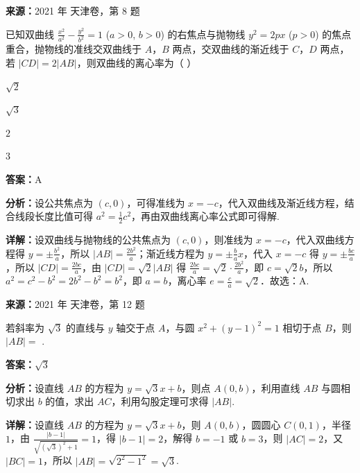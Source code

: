 \begin{question}[points=5]
\textbf{来源：}2021 年 天津卷，第 8 题\par
已知双曲线 $\frac{x^2}{a^2} - \frac{y^2}{b^2} = 1$ ($a > 0$, $b > 0$) 的右焦点与抛物线 $y^2 = 2px$ ($p > 0$) 的焦点重合，抛物线的准线交双曲线于 $A$，$B$ 两点，交双曲线的渐近线于 $C$，$D$ 两点，若 $|CD| = 2|AB|$，则双曲线的离心率为（   ）
\begin{choices}
  \item $\sqrt{2}$
  \item $\sqrt{3}$
  \item $2$
  \item $3$
\end{choices}
\begin{solution}
\textbf{答案：}A

\textbf{分析：}设公共焦点为 $(c,0)$，可得准线为 $x=-c$，代入双曲线及渐近线方程，结合线段长度比值可得 $a^2 = \frac{1}{2}c^2$，再由双曲线离心率公式即可得解.

\textbf{详解：}设双曲线与抛物线的公共焦点为 $(c,0)$，则准线为 $x=-c$，代入双曲线方程得 $y = \pm \frac{b^2}{a}$，所以 $|AB| = \frac{2b^2}{a}$；渐近线方程为 $y = \pm \frac{b}{a}x$，代入 $x=-c$ 得 $y = \pm \frac{bc}{a}$，所以 $|CD| = \frac{2bc}{a}$，由 $|CD| = \sqrt{2}|AB|$ 得 $\frac{2bc}{a} = \sqrt{2} \cdot \frac{2b^2}{a}$，即 $c = \sqrt{2}b$，所以 $a^2 = c^2 - b^2 = 2b^2 - b^2 = b^2$，即 $a=b$，离心率 $e = \frac{c}{a} = \sqrt{2}$．故选：A.
\end{solution}
\end{question}

\begin{question}[points=5]
\textbf{来源：}2021 年 天津卷，第 12 题\par
若斜率为 $\sqrt{3}$ 的直线与 $y$ 轴交于点 $A$，与圆 $x^2 + (y-1)^2 = 1$ 相切于点 $B$，则 $|AB| =$ .
\fillin[{$\sqrt{3}$}]
\begin{solution}
\textbf{答案：}$\sqrt{3}$

\textbf{分析：}设直线 $AB$ 的方程为 $y = \sqrt{3}x + b$，则点 $A(0,b)$，利用直线 $AB$ 与圆相切求出 $b$ 的值，求出 $AC$，利用勾股定理可求得 $|AB|$.

\textbf{详解：}设直线 $AB$ 的方程为 $y = \sqrt{3}x + b$，则 $A(0,b)$，圆圆心 $C(0,1)$，半径 $1$，由 $\frac{|b-1|}{\sqrt{(\sqrt{3})^2+1}} = 1$，得 $|b-1|=2$，解得 $b=-1$ 或 $b=3$，则 $|AC|=2$，又 $|BC|=1$，所以 $|AB| = \sqrt{2^2-1^2} = \sqrt{3}$.
\end{solution}
\end{question}

